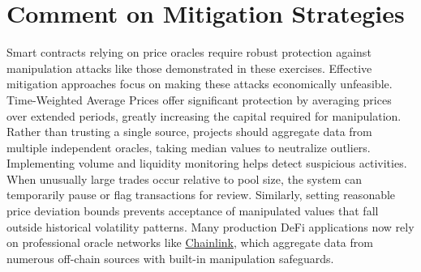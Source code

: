 \documentclass[12pt]{article}
\begin{document}
\section*{Comment on Mitigation Strategies}
Smart contracts relying on price oracles require robust protection against manipulation attacks like those demonstrated in these exercises. Effective mitigation approaches focus on making these attacks economically unfeasible.
Time-Weighted Average Prices offer significant protection by averaging prices over extended periods, greatly increasing the capital required for manipulation. Rather than trusting a single source, projects should aggregate data from multiple independent oracles, taking median values to neutralize outliers.
Implementing volume and liquidity monitoring helps detect suspicious activities. When unusually large trades occur relative to pool size, the system can temporarily pause or flag transactions for review. Similarly, setting reasonable price deviation bounds prevents acceptance of manipulated values that fall outside historical volatility patterns.
Many production DeFi applications now rely on professional oracle networks like \href{https://chain.link/}{Chainlink}, which aggregate data from numerous off-chain sources with built-in manipulation safeguards.
\end{document}
